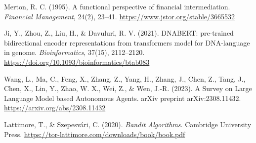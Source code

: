 \documentclass[11pt,a4paper]{article}
\begin{document}
{\small
\begin{thebibliography}{9}
Merton, R. C. (1995). A functional perspective of financial intermediation. 
\textit{Financial Management}, 24(2), 23--41. 
\url{https://www.jstor.org/stable/3665532}

Ji, Y., Zhou, Z., Liu, H., \& Davuluri, R. V. (2021). 
DNABERT: pre-trained bidirectional encoder representations from transformers model for DNA-language in genome. 
\textit{Bioinformatics}, 37(15), 2112--2120. 
\url{https://doi.org/10.1093/bioinformatics/btab083}

Wang, L., Ma, C., Feng, X., Zhang, Z., Yang, H., Zhang, J., Chen, Z., Tang, J., Chen, X., Lin, Y., Zhao, W. X., Wei, Z., \& Wen, J.-R. (2023). 
A Survey on Large Language Model based Autonomous Agents. 
arXiv preprint arXiv:2308.11432. 
\url{https://arxiv.org/abs/2308.11432}

Lattimore, T., \& Szepesvári, C. (2020). 
\textit{Bandit Algorithms}. 
Cambridge University Press. 
\url{https://tor-lattimore.com/downloads/book/book.pdf}

\end{thebibliography}
}
\end{document}
